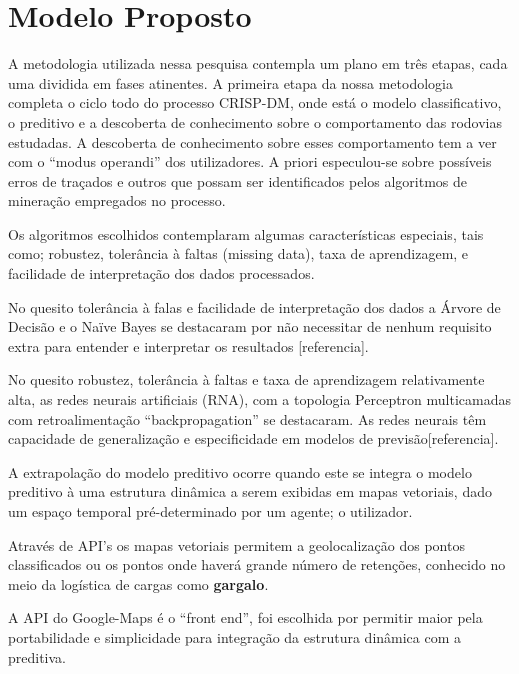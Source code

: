\section{Modelo Proposto}

A metodologia utilizada nessa pesquisa contempla um plano em três etapas, cada uma dividida em fases atinentes.
A primeira etapa da nossa metodologia completa o ciclo todo do processo CRISP-DM, onde está o modelo classificativo, o preditivo e 
a descoberta de conhecimento sobre o comportamento das rodovias estudadas. A descoberta de conhecimento sobre esses comportamento 
 tem a ver com o ``modus operandi'' dos utilizadores. A priori especulou-se sobre possíveis erros de traçados e outros que possam
ser identificados pelos algoritmos de mineração empregados no processo.

Os algoritmos escolhidos contemplaram algumas características especiais, tais como; robustez, tolerância à faltas (missing data),
taxa de aprendizagem, e facilidade de interpretação dos dados processados. 

No quesito tolerância à falas e facilidade de interpretação dos dados a Árvore de Decisão e o Naïve Bayes se destacaram por não necessitar
de nenhum requisito extra para entender e interpretar os resultados [referencia].

No quesito robustez, tolerância à faltas e taxa de aprendizagem relativamente alta, as redes neurais artificiais (RNA), com a 
topologia Perceptron multicamadas com retroalimentação ``backpropagation'' se destacaram. 
As redes neurais têm capacidade de generalização e especificidade em modelos de previsão[referencia]. 

A extrapolação do modelo preditivo ocorre quando este se integra o modelo preditivo à uma estrutura dinâmica a serem exibidas em mapas vetoriais, dado um espaço temporal pré-determinado por um agente; o utilizador. 

Através de API's os mapas vetoriais permitem a geolocalização dos pontos classificados ou os pontos onde haverá grande número de 
retenções, conhecido no meio da logística de cargas como \textbf{gargalo}.

A API do Google-Maps é o ``front end'', foi escolhida por permitir maior pela portabilidade e simplicidade para integração da estrutura
dinâmica com a preditiva.

